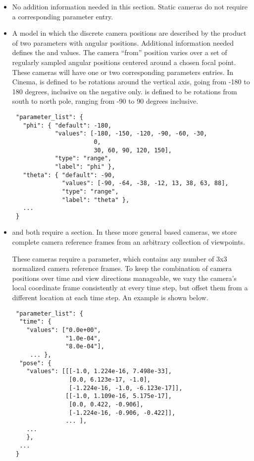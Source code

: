 \begin{itemize}
\item \camstatic No addition information needed in this section. 
Static cameras do not require a corresponding parameter entry.

\item \camphi A model in which the discrete camera positions are described by the product of two parameters with angular positions. Additional information needed defines the \cphi and \ctheta values. The camera ``from'' position varies over a set of regularly sampled angular positions centered around a chosen focal point. These cameras will have one or two corresponding parameters entries. In Cinema, \cphi is defined to be rotations around the vertical axis, going from -180 to 180 degrees, inclusive on the negative only. \ctheta is defined to be rotations from south to north pole, ranging from -90 to 90 degrees inclusive.
\begin{verbatim}
 "parameter_list": {
   "phi": { "default": -180,
            "values": [-180, -150, -120, -90, -60, -30,
                       0,
                       30, 60, 90, 120, 150],
            "type": "range",
            "label": "phi" },
   "theta": { "default": -90,
              "values": [-90, -64, -38, -12, 13, 38, 63, 88],
              "type": "range",
              "label": "theta" },
   ...
 }
\end{verbatim}
\item \camyaw and \camazimuth both require a \pose section. 
In these more general \pose based cameras, we store complete camera reference frames from an arbitrary collection of viewpoints. 

These cameras require a \pose parameter, which contains any number of 3x3 normalized camera reference frames. To keep the combination of camera positions over time and view directions manageable, we vary the camera's local coordinate frame consistently at every time step, but offset them from a different location at each time step. An example is shown below. 
\begin{verbatim}
 "parameter_list": {
  "time": {
    "values": ["0.0e+00",
               "1.0e-04",
               "8.0e-04"],
     ... },
  "pose": {
    "values": [[[-1.0, 1.224e-16, 7.498e-33],
                [0.0, 6.123e-17, -1.0],
                [-1.224e-16, -1.0, -6.123e-17]],
               [[-1.0, 1.109e-16, 5.175e-17],
                [0.0, 0.422, -0.906],
                [-1.224e-16, -0.906, -0.422]],
               ... ],
    ...
    },
  ...
 }
\end{verbatim}
\end{itemize}

